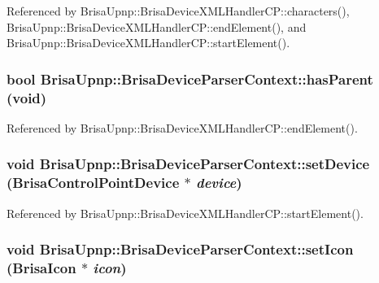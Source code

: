 Referenced by BrisaUpnp::BrisaDeviceXMLHandlerCP::characters(), BrisaUpnp::BrisaDeviceXMLHandlerCP::endElement(), and BrisaUpnp::BrisaDeviceXMLHandlerCP::startElement().\hypertarget{classBrisaUpnp_1_1BrisaDeviceParserContext_a8a10fb88e466282963b6eb6527aab058}{
\subsubsection[{hasParent}]{\setlength{\rightskip}{0pt plus 5cm}bool BrisaUpnp::BrisaDeviceParserContext::hasParent (void)}}
\label{classBrisaUpnp_1_1BrisaDeviceParserContext_a8a10fb88e466282963b6eb6527aab058}


Referenced by BrisaUpnp::BrisaDeviceXMLHandlerCP::endElement().\hypertarget{classBrisaUpnp_1_1BrisaDeviceParserContext_a7b9d6fdb5d62eae2c35becaa91f15c84}{
\subsubsection[{setDevice}]{\setlength{\rightskip}{0pt plus 5cm}void BrisaUpnp::BrisaDeviceParserContext::setDevice ({\bf BrisaControlPointDevice} $\ast$ {\em device})}}
\label{classBrisaUpnp_1_1BrisaDeviceParserContext_a7b9d6fdb5d62eae2c35becaa91f15c84}


Referenced by BrisaUpnp::BrisaDeviceXMLHandlerCP::startElement().\hypertarget{classBrisaUpnp_1_1BrisaDeviceParserContext_a7f472fae45ada97dc293bc9c1361558f}{
\subsubsection[{setIcon}]{\setlength{\rightskip}{0pt plus 5cm}void BrisaUpnp::BrisaDeviceParserContext::setIcon ({\bf BrisaIcon} $\ast$ {\em icon})}}
\label{classBrisaUpnp_1_1BrisaDeviceParserContext_a7f472fae45ada97dc293bc9c1361558f}


